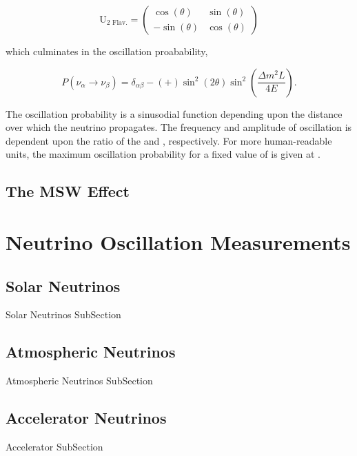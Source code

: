 \begin{equation}
  \label{eq:NeutrinoOscillationPhysics_PMNS_2Flavour}
  \mathrm{U_{\text{2 Flav.}}} = \begin{pmatrix} \cos(\theta) & \sin(\theta) \\ -\sin(\theta) & \cos(\theta) \end{pmatrix}
\end{equation}

which culminates in the oscillation proabability,

\begin{equation}
  \label{eq:NeutrinoOscillationPhysics_PMNS_2FlavourOscProb}
  P(\nu_{\alpha} \rightarrow \nu_{\beta}) = \delta_{\alpha \beta} - \left( + \right) \sin^{2} \left( 2\theta \right) \sin^2 \left( \frac{\Delta m^{2} L}{4E} \right).
\end{equation}

The oscillation probability is a sinusodial function depending upon the distance over which the neutrino propagates. The frequency and amplitude of oscillation is dependent upon the ratio of the  and , respectively. For more human-readable units, the maximum oscillation probability for a fixed value of \quickmath{\theta} is given at .

\subsection{The MSW Effect}

\section{Neutrino Oscillation Measurements}
\label{sec:NeutrinoOscillationPhysics_OscillationMeasurements}

\subsection{Solar Neutrinos}
\label{subsec:NeutrinoOscillationPhysics_SolarNeutrinos}
Solar Neutrinos SubSection

\subsection{Atmospheric Neutrinos}
\label{subsec:NeutrinoOscillationPhysics_AtmosphericNeutrinos}
Atmospheric Neutrinos SubSection

\subsection{Accelerator Neutrinos}
\label{subsec:NeutrinoOscillationPhysics_AcceleratorNeutrinos}
Accelerator SubSection

